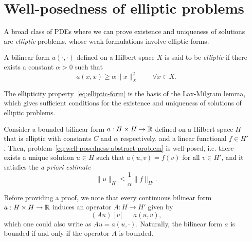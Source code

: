 \section{Well-posedness of elliptic problems}
A broad class of PDEs where we can prove existence and uniqueness of solutions are \emph{elliptic} problems, whose weak formulations involve elliptic forms. 
\begin{definition}\label{def:elliptic-form}
    A bilinear form $a(\cdot, \cdot)$ defined on a Hilbert space $X$ is said to be \emph{elliptic} if there exists a constant $\alpha>0$ such that
    \begin{equation}\label{eq:elliptic-form}
        a(x, x) \geq \alpha \| x \|^2_X \qquad \forall x\in X.
    \end{equation}
\end{definition}

The ellipticity property~\eqref{eq:elliptic-form} is the basis of the Lax-Milgram lemma, which gives sufficient conditions for the existence and uniqueness of solutions of elliptic problems.
\begin{lemma}\label{lemma:lax-milgram}
    Consider a bounded bilinear form $a: H\times H\to \mathbb{R}$ defined on a Hilbert space $H$ that is elliptic with constants $C$ and $\alpha$ respectively, and a linear functional $f\in H'$. Then, problem~\eqref{eq:well-posedness-abstract-problem} is well-posed, i.e. there exists a unique solution $u\in H$ such that $a(u,v)=f(v)$ for all $v\in H'$, and it satisfies the \emph{a priori estimate}
    \begin{equation}\label{eq:lax-milgram-a-priori}
        \| u\|_H \leq \frac 1 \alpha \| f \|_{H'} .
    \end{equation}
\end{lemma}

Before providing a proof, we note that every continuous bilinear form $a:H\times H\to \mathbb{R}$ induces an operator $A:H\to H'$ given by
\begin{equation}\label{eq:form-induced-by-matrix}
    (Au)[v] = a(u,v),
\end{equation}
which one could also write as $Au = a(u, \cdot)$. Naturally, the bilinear form $a$ is bounded if and only if the operator $A$ is bounded. 

